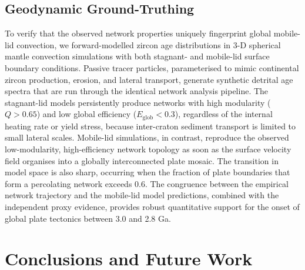 \documentclass{article}
\begin{document}
\subsection{Geodynamic Ground-Truthing}

To verify that the observed network properties uniquely fingerprint global mobile-lid convection, we forward-modelled zircon age distributions in 3-D spherical mantle convection simulations with both stagnant- and mobile-lid surface boundary conditions. Passive tracer particles, parameterised to mimic continental zircon production, erosion, and lateral transport, generate synthetic detrital age spectra that are run through the identical network analysis pipeline. The stagnant-lid models persistently produce networks with high modularity (\( Q > 0.65 \)) and low global efficiency (\( E_{\text{glob}} < 0.3 \)), regardless of the internal heating rate or yield stress, because inter-craton sediment transport is limited to small lateral scales. Mobile-lid simulations, in contrast, reproduce the observed low-modularity, high-efficiency network topology as soon as the surface velocity field organises into a globally interconnected plate mosaic. The transition in model space is also sharp, occurring when the fraction of plate boundaries that form a percolating network exceeds 0.6. The congruence between the empirical network trajectory and the mobile-lid model predictions, combined with the independent proxy evidence, provides robust quantitative support for the onset of global plate tectonics between 3.0 and 2.8 Ga.

\section{Conclusions and Future Work}
\end{document}
